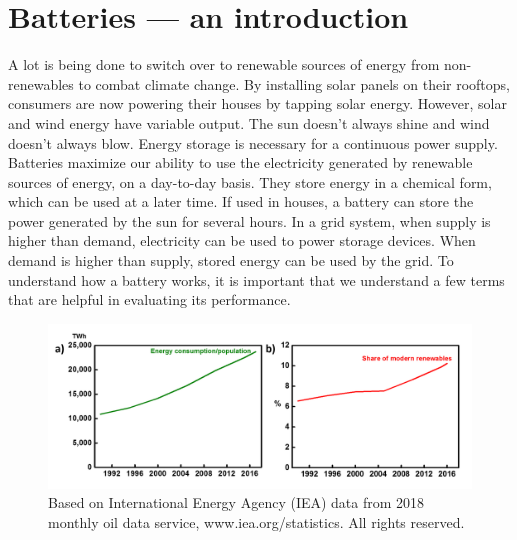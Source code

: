 \chapter{Batteries --- an introduction} %
 \label{chap1} %
\newcommand{\keyword}[1]{\textbf{#1}}
\newcommand{\tabhead}[1]{\textbf{#1}}
\newcommand{\code}[1]{\texttt{#1}}
\newcommand{\file}[1]{\texttt{\bfseries#1}}
\newcommand{\option}[1]{\texttt{\itshape#1}}

A lot is being done to switch over to renewable sources of energy from non-renewables to combat climate change. By installing solar panels on their rooftops, consumers are now powering their houses by tapping solar energy. However, solar and wind energy have variable output. The sun doesn't always shine and wind doesn't always blow. Energy storage is necessary for a continuous power supply. Batteries maximize our ability to use the electricity generated by renewable sources of energy, on a day-to-day basis. They store energy in a chemical form, which can be used at a later time. If used in houses, a battery can store the power generated by the sun for several hours. In a grid system, when supply is higher than demand, electricity can be used to power storage devices. When demand is higher than supply, stored energy can be used by the grid. To understand how a battery works, it is important that we understand a few terms that are helpful in evaluating its performance. 

\begin{figure}[tbh!]
\centering
\includegraphics[width=\textwidth]{Figures/chap1fig/IEC2}
\caption{Based on International Energy Agency (IEA) data from 2018 monthly oil data service, www.iea.org/statistics. All rights reserved.}
\label{Figures/chap1fig:IEC2}
\end{figure}

